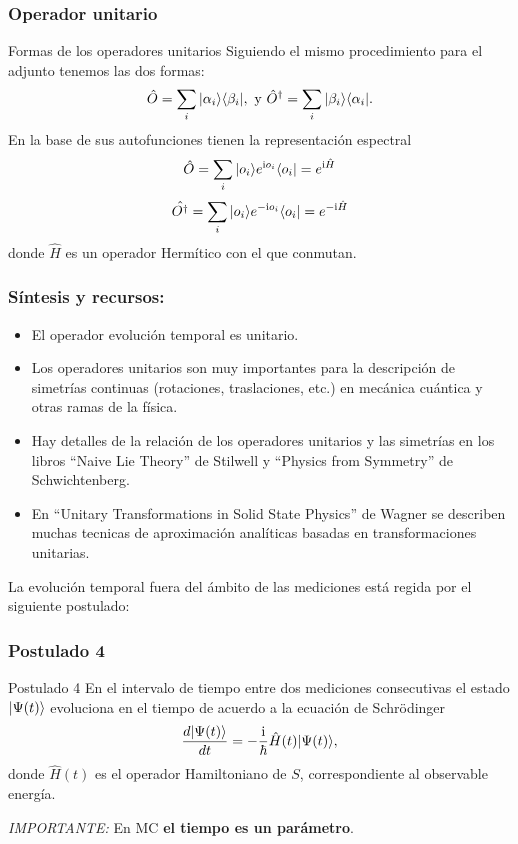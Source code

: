 \documentclass{beamer}
\begin{document}
\begin{frame}
    \frametitle{Operador unitario}  
        \begin{block}{Formas de los operadores unitarios}
            Siguiendo el mismo procedimiento para el adjunto tenemos las dos formas:
            \[ \hat{O} = \sum_{i} \ket{\alpha_i}\bra{\beta_i}, \ \mathrm{y} \ \hat{O}^\dagger = \sum_{i} \ket{\beta_i}\bra{\alpha_i}. \]
            En la base de sus autofunciones tienen la representación espectral
            \[ \hat{O} = \sum_i | o_i \rangle e^{\mathrm{i}o_i} \langle o_i | = e^{\mathrm{i} \hat{H}} \] 
            \[ \hat{O^\dagger} = \sum_i | o_i \rangle e^{-\mathrm{i}o_i} \langle o_i | = e^{-\mathrm{i} \hat{H}} \] 
            donde $\hat{H}$ es un operador Hermítico con el que conmutan.
        \end{block}

\end{frame} 


\begin{frame}
\frametitle{Síntesis y recursos:}

\begin{itemize}
    \item El operador evolución temporal es unitario.
    \item Los operadores unitarios son muy importantes para la descripción de simetrías continuas (rotaciones, traslaciones, etc.) en mecánica cuántica y otras ramas de la física. 
    \item Hay detalles de la relación de los operadores unitarios y las simetrías en los libros ``Naive Lie Theory'' de Stilwell y ``Physics from Symmetry'' de Schwichtenberg. 
    \item En ``Unitary Transformations in Solid State Physics'' de Wagner se describen muchas tecnicas de aproximación analíticas basadas en transformaciones unitarias.
\end{itemize}
\end{frame}


\begin{frame}

    La evolución temporal fuera del ámbito de las mediciones está regida por el siguiente postulado:

    \frametitle{Postulado 4}
    
    \begin{block}{Postulado 4}
        En el intervalo de tiempo entre dos mediciones consecutivas el estado $| \Psi(t) \rangle$ evoluciona en el tiempo de acuerdo a la ecuación de Schrödinger
        \[\frac{d| \Psi(t) \rangle}{dt} = -\frac{\mathrm{i}}{\hbar} \hat{H}(t)| \Psi(t) \rangle,\]
        donde $\hat{H}(t)$ es el operador Hamiltoniano de $S$, correspondiente al observable energía.
    \end{block}
    {\em IMPORTANTE:} En MC {\bf el tiempo es un parámetro}.
    
\end{frame}
\end{document}
